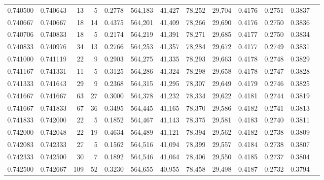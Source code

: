 \begin{tabular}{rrrrrrrrrrrrr}
0.740500 & 0.740643 &    13 &   5 &                                     0.2778 & 564,183 &  41,427 &  78,252 &  29,704 & 0.4176 & 0.2751 & 0.3837 \\
0.740667 & 0.740667 &    18 &  14 &                                     0.4375 & 564,201 &  41,409 &  78,266 &  29,690 & 0.4176 & 0.2750 & 0.3836 \\
0.740706 & 0.740833 &    18 &   5 &                                     0.2174 & 564,219 &  41,391 &  78,271 &  29,685 & 0.4177 & 0.2750 & 0.3834 \\
0.740833 & 0.740976 &    34 &  13 &                                     0.2766 & 564,253 &  41,357 &  78,284 &  29,672 & 0.4177 & 0.2749 & 0.3831 \\
0.741000 & 0.741119 &    22 &   9 &                                     0.2903 & 564,275 &  41,335 &  78,293 &  29,663 & 0.4178 & 0.2748 & 0.3829 \\
0.741167 & 0.741331 &    11 &   5 &                                     0.3125 & 564,286 &  41,324 &  78,298 &  29,658 & 0.4178 & 0.2747 & 0.3828 \\
0.741333 & 0.741643 &    29 &   9 &                                     0.2368 & 564,315 &  41,295 &  78,307 &  29,649 & 0.4179 & 0.2746 & 0.3825 \\
0.741667 & 0.741667 &    63 &  27 &                                     0.3000 & 564,378 &  41,232 &  78,334 &  29,622 & 0.4181 & 0.2744 & 0.3819 \\
0.741667 & 0.741833 &    67 &  36 &                                     0.3495 & 564,445 &  41,165 &  78,370 &  29,586 & 0.4182 & 0.2741 & 0.3813 \\
0.741833 & 0.742000 &    22 &   5 &                                     0.1852 & 564,467 &  41,143 &  78,375 &  29,581 & 0.4183 & 0.2740 & 0.3811 \\
0.742000 & 0.742048 &    22 &  19 &                                     0.4634 & 564,489 &  41,121 &  78,394 &  29,562 & 0.4182 & 0.2738 & 0.3809 \\
0.742083 & 0.742333 &    27 &   5 &                                     0.1562 & 564,516 &  41,094 &  78,399 &  29,557 & 0.4184 & 0.2738 & 0.3807 \\
0.742333 & 0.742500 &    30 &   7 &                                     0.1892 & 564,546 &  41,064 &  78,406 &  29,550 & 0.4185 & 0.2737 & 0.3804 \\
0.742500 & 0.742667 &   109 &  52 &                                     0.3230 & 564,655 &  40,955 &  78,458 &  29,498 & 0.4187 & 0.2732 & 0.3794 \\

\end{tabular}
